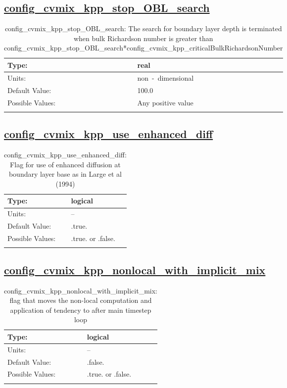 \subsection[config\_cvmix\_kpp\_stop\_OBL\_search]{\hyperref[sec:nm_tab_cvmix]{config\_cvmix\_kpp\_stop\_OBL\_search}}
\label{subsec:nm_sec_config_cvmix_kpp_stop_OBL_search}
\begin{center}
\begin{longtable}{| p{2.0in} || p{4.0in} |}
    \hline
    Type: & real \\
    \hline
    Units: & \si{non-dimensional} \\
    \hline
    Default Value: & 100.0 \\
    \hline
    Possible Values: & Any positive value \\
    \hline
    \caption{config\_cvmix\_kpp\_stop\_OBL\_search: The search for boundary layer depth is terminated when bulk Richardson number is greater than config\_cvmix\_kpp\_stop\_OBL\_search*config\_cvmix\_kpp\_criticalBulkRichardsonNumber}
\end{longtable}
\end{center}
\subsection[config\_cvmix\_kpp\_use\_enhanced\_diff]{\hyperref[sec:nm_tab_cvmix]{config\_cvmix\_kpp\_use\_enhanced\_diff}}
\label{subsec:nm_sec_config_cvmix_kpp_use_enhanced_diff}
\begin{center}
\begin{longtable}{| p{2.0in} || p{4.0in} |}
    \hline
    Type: & logical \\
    \hline
    Units: & -- \\
    \hline
    Default Value: & .true. \\
    \hline
    Possible Values: & .true. or .false. \\
    \hline
    \caption{config\_cvmix\_kpp\_use\_enhanced\_diff: Flag for use of enhanced diffusion at boundary layer base as in Large et al (1994)}
\end{longtable}
\end{center}
\subsection[config\_cvmix\_kpp\_nonlocal\_with\_implicit\_mix]{\hyperref[sec:nm_tab_cvmix]{config\_cvmix\_kpp\_nonlocal\_with\_implicit\_mix}}
\label{subsec:nm_sec_config_cvmix_kpp_nonlocal_with_implicit_mix}
\begin{center}
\begin{longtable}{| p{2.0in} || p{4.0in} |}
    \hline
    Type: & logical \\
    \hline
    Units: & -- \\
    \hline
    Default Value: & .false. \\
    \hline
    Possible Values: & .true. or .false. \\
    \hline
    \caption{config\_cvmix\_kpp\_nonlocal\_with\_implicit\_mix: flag that moves the non-local computation and application of tendency to after main timestep loop}
\end{longtable}
\end{center}
